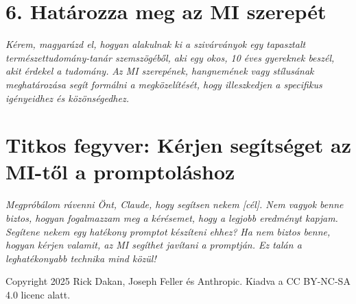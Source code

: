 \documentclass[a4paper, 11pt]{article}
\begin{document}
\section*{6. Határozza meg az MI szerepét}
\textit{Kérem, magyarázd el, hogyan alakulnak ki a szivárványok egy tapasztalt természettudomány-tanár szemszögéből, aki egy okos, 10 éves gyereknek beszél, akit érdekel a tudomány.}
\textit{Az MI szerepének, hangnemének vagy stílusának meghatározása segít formálni a megközelítését, hogy illeszkedjen a specifikus igényeidhez és közönségedhez.}

\section*{Titkos fegyver: Kérjen segítséget az MI-től a promptoláshoz}
\textit{Megpróbálom rávenni Önt, Claude, hogy segítsen nekem [cél]. Nem vagyok benne biztos, hogyan fogalmazzam meg a kérésemet, hogy a legjobb eredményt kapjam. Segítene nekem egy hatékony promptot készíteni ehhez?}
\textit{Ha nem biztos benne, hogyan kérjen valamit, az MI segíthet javítani a promptján. Ez talán a leghatékonyabb technika mind közül!}

\vspace{\fill}
\begin{center}
    \small{Copyright 2025 Rick Dakan, Joseph Feller és Anthropic. Kiadva a CC BY-NC-SA 4.0 licenc alatt.}
\end{center}
\end{document}
